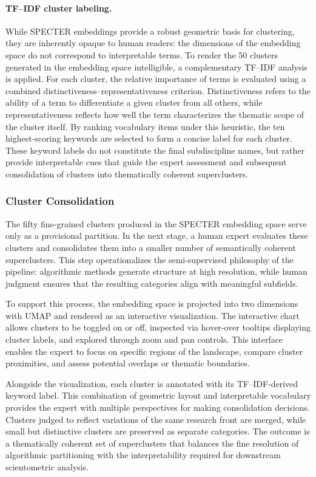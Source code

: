 \documentclass{article}
\begin{document}
\paragraph{TF–IDF cluster labeling.}  
While SPECTER embeddings provide a robust geometric basis for clustering, they are inherently opaque to human readers: the dimensions of the embedding space do not correspond to interpretable terms. To render the 50 clusters generated in the embedding space intelligible, a complementary TF–IDF analysis is applied. For each cluster, the relative importance of terms is evaluated using a combined distinctiveness–representativeness criterion. Distinctiveness refers to the ability of a term to differentiate a given cluster from all others, while representativeness reflects how well the term characterizes the thematic scope of the cluster itself. By ranking vocabulary items under this heuristic, the ten highest-scoring keywords are selected to form a concise label for each cluster. These keyword labels do not constitute the final subdiscipline names, but rather provide interpretable cues that guide the expert assessment and subsequent consolidation of clusters into thematically coherent superclusters.



\subsubsection{Cluster Consolidation}

The fifty fine-grained clusters produced in the SPECTER embedding space serve only as a provisional partition. In the next stage, a human expert evaluates these clusters and consolidates them into a smaller number of semantically coherent superclusters. This step operationalizes the semi-supervised philosophy of the pipeline: algorithmic methods generate structure at high resolution, while human judgment ensures that the resulting categories align with meaningful subfields.

To support this process, the embedding space is projected into two dimensions with UMAP and rendered as an interactive visualization. The interactive chart allows clusters to be toggled on or off, inspected via hover-over tooltips displaying cluster labels, and explored through zoom and pan controls. This interface enables the expert to focus on specific regions of the landscape, compare cluster proximities, and assess potential overlaps or thematic boundaries.

Alongside the visualization, each cluster is annotated with its TF–IDF-derived keyword label. This combination of geometric layout and interpretable vocabulary provides the expert with multiple perspectives for making consolidation decisions. Clusters judged to reflect variations of the same research front are merged, while small but distinctive clusters are preserved as separate categories. The outcome is a thematically coherent set of superclusters that balances the fine resolution of algorithmic partitioning with the interpretability required for downstream scientometric analysis.
\end{document}
